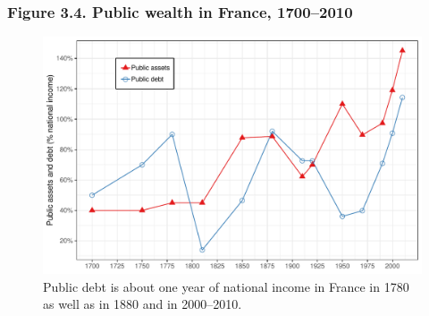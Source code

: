 \documentclass[t]{beamer}\usepackage[]{graphicx}\usepackage[]{color}
\newenvironment{knitrout}{}{} %
\begin{document}
\begin{frame}[label=Figure_3_4]
\frametitle{Figure 3.4. Public wealth in France, 1700--2010}
\begin{figure}[t]
\begin{minipage}[b]{\textwidth}
\centering
\begin{knitrout}\footnotesize
{}\color{fgcolor}

{\centering \includegraphics[width=1\linewidth]{figures/color/Figure_3_4} 

}



\end{knitrout}
\caption{Public debt is about one year of national income in France in 1780 as well as in 1880 and in 2000--2010.}
\end{minipage}
\end{figure}
\end{frame}
\end{document}
